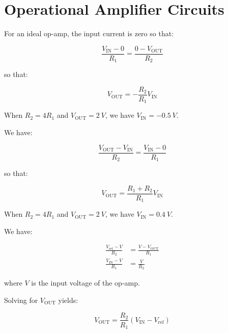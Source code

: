 \documentclass[12pt]{article}
\begin{document}



\pagebreak
\section*{Operational Amplifier Circuits}



For an ideal op-amp, the input current is zero so that:

\begin{equation}
    \frac{V_{\text{IN}} - 0}{R_{1}} = \frac{0 - V_{\text{OUT}}}{R_{2}}
\end{equation}

so that:

\begin{equation}
    V_{\text{OUT}} = -\frac{R_{2}}{R_{1}} V_{\text{IN}}
\end{equation}

When $R_{2} = 4R_{1}$ and $V_{\text{OUT}} = \qty{2}{V}$, we have $V_{\text{IN}} = \qty{-0.5}{V}$.

We have:

\begin{equation}
    \frac{V_{\text{OUT}} - V_{\text{IN}}}{R_{2}} = \frac{V_{\text{IN}} - 0}{R_{1}}
\end{equation}

so that:

\begin{equation}
    V_{\text{OUT}} = \frac{R_{1} + R_{2}}{R_{1}} V_{\text{IN}}
\end{equation}

When $R_{2} = 4R_{1}$ and $V_{\text{OUT}} = \qty{2}{V}$, we have $V_{\text{IN}} = \qty{0.4}{V}$.

We have:

\begin{equation}
\begin{split}
    \frac{V_{\text{ref}} - V}{R_{2}} &= \frac{V - V_{\text{OUT}}}{R_{1}} \\
    \frac{V_{\text{IN}} - V}{R_{1}} &= \frac{V}{R_{2}}
\end{split}
\end{equation}

where $V$ is the input voltage of the op-amp.

Solving for $V_{\text{OUT}}$ yields:

\begin{equation}
    V_{\text{OUT}} = \frac{R_{2}}{R_{1}} (V_{\text{IN}} - V_{\text{ref}})
\end{equation}
\end{document}
